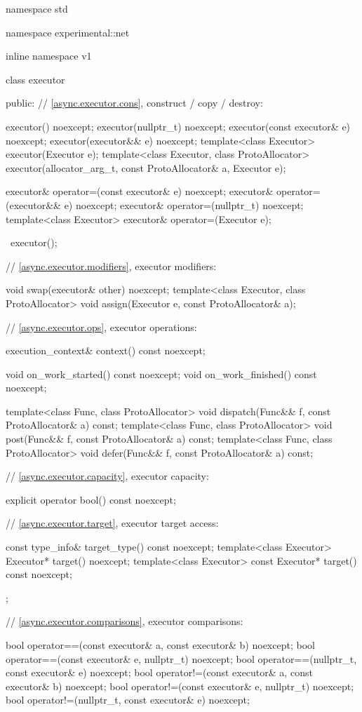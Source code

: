 \begin{codeblock}
namespace std {
namespace experimental::net {
inline namespace v1 {

  class executor
  {
  public:
    // \ref{async.executor.cons}, construct / copy / destroy:

    executor() noexcept;
    executor(nullptr_t) noexcept;
    executor(const executor& e) noexcept;
    executor(executor&& e) noexcept;
    template<class Executor> executor(Executor e);
    template<class Executor, class ProtoAllocator>
      executor(allocator_arg_t, const ProtoAllocator& a, Executor e);

    executor& operator=(const executor& e) noexcept;
    executor& operator=(executor&& e) noexcept;
    executor& operator=(nullptr_t) noexcept;
    template<class Executor> executor& operator=(Executor e);

    ~executor();

    // \ref{async.executor.modifiers}, executor modifiers:

    void swap(executor& other) noexcept;
    template<class Executor, class ProtoAllocator>
      void assign(Executor e, const ProtoAllocator& a);

    // \ref{async.executor.ops}, executor operations:

    execution_context& context() const noexcept;

    void on_work_started() const noexcept;
    void on_work_finished() const noexcept;

    template<class Func, class ProtoAllocator>
      void dispatch(Func&& f, const ProtoAllocator& a) const;
    template<class Func, class ProtoAllocator>
      void post(Func&& f, const ProtoAllocator& a) const;
    template<class Func, class ProtoAllocator>
      void defer(Func&& f, const ProtoAllocator& a) const;

    // \ref{async.executor.capacity}, executor capacity:

    explicit operator bool() const noexcept;

    // \ref{async.executor.target}, executor target access:

    const type_info& target_type() const noexcept;
    template<class Executor> Executor* target() noexcept;
    template<class Executor> const Executor* target() const noexcept;
  };

  // \ref{async.executor.comparisons}, executor comparisons:

  bool operator==(const executor& a, const executor& b) noexcept;
  bool operator==(const executor& e, nullptr_t) noexcept;
  bool operator==(nullptr_t, const executor& e) noexcept;
  bool operator!=(const executor& a, const executor& b) noexcept;
  bool operator!=(const executor& e, nullptr_t) noexcept;
  bool operator!=(nullptr_t, const executor& e) noexcept;

}}}
\end{codeblock}
